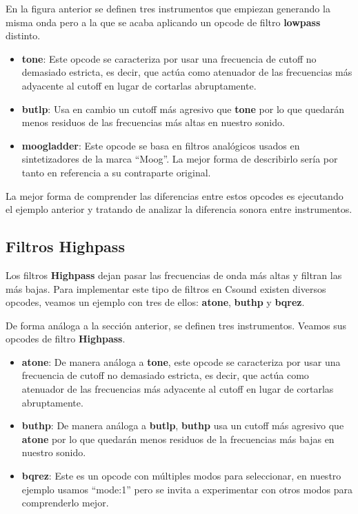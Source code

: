 \pagebreak


En la figura anterior se definen tres instrumentos que empiezan generando la misma onda pero a la que se acaba aplicando un opcode de filtro \textbf{lowpass} distinto.

\begin{itemize}
 \item \textbf{tone}: Este opcode se caracteriza por usar una frecuencia de cutoff no demasiado estricta, es decir, que actúa como atenuador de las frecuencias más adyacente al cutoff en lugar de cortarlas abruptamente.
 \item \textbf{butlp}: Usa en cambio un cutoff más agresivo que \textbf{tone} por lo que quedarán menos residuos de las frecuencias más altas en nuestro sonido.
 \item \textbf{moogladder}: Este opcode se basa en filtros analógicos usados en sintetizadores de la marca ``Moog''. La mejor forma de describirlo sería por tanto en referencia a su contraparte original.
\end{itemize}

La mejor forma de comprender las diferencias entre estos opcodes es ejecutando el ejemplo anterior y tratando de analizar la diferencia sonora entre instrumentos.

\subsection{Filtros Highpass}

Los filtros \textbf{Highpass} dejan pasar las frecuencias de onda más altas y filtran las más bajas. Para implementar este tipo de filtros en Csound existen diversos opcodes, veamos un ejemplo con tres de ellos: \textbf{atone}, \textbf{buthp} y \textbf{bqrez}.


De forma análoga a la sección anterior, se definen tres instrumentos. Veamos sus opcodes de filtro \textbf{Highpass}.
\pagebreak
\begin{itemize}
 \item \textbf{atone}: De manera análoga a \textbf{tone}, este opcode se caracteriza por usar una frecuencia de cutoff no demasiado estricta, es decir, que actúa como atenuador de las frecuencias más adyacente al cutoff en lugar de cortarlas abruptamente.
 \item \textbf{buthp}: De manera análoga a \textbf{butlp}, \textbf{buthp} usa un cutoff más agresivo que \textbf{atone} por lo que quedarán menos residuos de la frecuencias más bajas en nuestro sonido.
 \item \textbf{bqrez}: Este es un opcode con múltiples modos para seleccionar, en nuestro ejemplo usamos ``mode:1'' pero se invita a experimentar con otros modos para comprenderlo mejor.
\end{itemize}

